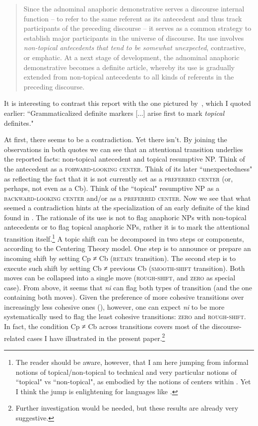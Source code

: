 \documentclass[output=paper
,modfonts
,nonflat]{langsci/langscibook}
\begin{document}
\begin{quotation}
	Since the adnominal anaphoric demonstrative serves a discourse internal function -- to refer to the same referent as its antecedent and thus track participants of the preceding discourse -- it serves as a common strategy to establish major participants in the universe of discourse. Its use involves \textit{non-topical antecedents that tend to be somewhat unexpected}, contrastive, or emphatic. At a next stage of development, the adnominal anaphoric demonstrative becomes a definite article, whereby its use is gradually extended from non-topical antecedents to all kinds of referents in the preceding discourse. \citep[101--102, emphasis mine]{HeineKuteva2006}
\end{quotation}


It is interesting to contrast this report with the one pictured by~\citet[474]{Givon2001}, which I quoted earlier: ``Grammaticalized definite markers [...] arise first to mark \textit{topical} definites."


At first, there seems to be a contradiction. Yet there isn't. By joining the observations in both quotes we can see that an attentional transition underlies the reported facts: non-topical antecedent and topical resumptive NP. Think of the antecedent as a \textsc{forward-looking center}. Think of its later ``unexpectedness" as reflecting the fact that it is not currently set as a \textsc{preferred center} (or, perhaps, not even as a Cb). Think of the ``topical" resumptive NP as a \textsc{backward-looking center} and/or as a \textsc{preferred center}. Now we see that what seemed a contradiction hints at the specialization of an early definite of the kind found in . The rationale of its use is not to flag anaphoric NPs with non-topical antecedents or to flag topical anaphoric NPs, rather it is to mark the attentional transition itself.\footnote{The reader should be aware, however, that I am here jumping from informal notions of topical/non-topical to technical and very particular notions of ``topical" vs ``non-topical", as embodied by the notions of centers within . Yet I think the jump is enlightening for languages like .} 
A topic shift can be decomposed in two steps or components, according to the Centering Theory model. One step is to announce or prepare an incoming shift by setting Cp ≠ Cb (\textsc{retain} transition). The second step is to execute such shift by setting Cb ≠ previous Cb (\textsc{smooth-shift} transition). 
Both moves can be collapsed into a single move (\textsc{rough-shift}, and \textsc{zero} as special case). From  above, it seems that \textit{ni} can flag both types of transition (and the one containing both moves). 
Given the preference of more cohesive transitions over increasingly less cohesive ones (), however, one can expect \textit{ni} to be more systematically used to flag the least cohesive transitions: \textsc{zero} and \textsc{rough-shift}. In fact, the condition Cp ≠ Cb across transitions covers most of the discourse-related cases I have illustrated in the present paper.\footnote{Further investigation would be needed, but these results are already very suggestive.}
\end{document}
